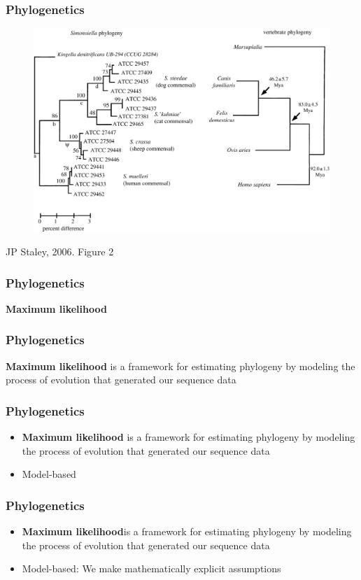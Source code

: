 \documentclass{beamer}
\begin{document}
\begin{frame}
\frametitle{Phylogenetics}
\begin{figure}
    \includegraphics[scale=0.2]{F2_large.jpg}
    \end{figure}
\centerline{JP Staley, 2006. Figure 2}

\end{frame}


\begin{frame}
\frametitle{Phylogenetics}
\textbf{Maximum likelihood}
\end{frame}
\begin{frame}
\frametitle{Phylogenetics}
\textbf{Maximum likelihood} is a framework for estimating phylogeny by modeling the process of evolution that generated our sequence data
\end{frame}

\begin{frame}
\frametitle{Phylogenetics}
\begin{itemize}
\item \textbf{Maximum likelihood} is a framework for estimating phylogeny by modeling the process of evolution that generated our sequence data
\item Model-based 
\end{itemize}
\end{frame} 

\begin{frame}
\frametitle{Phylogenetics}
\begin{itemize}
\item \textbf{Maximum likelihood}is a framework for estimating phylogeny by modeling the process of evolution that generated our sequence data
\item Model-based: We make mathematically explicit assumptions 
\end{itemize}
\end{frame} 
\end{document}
